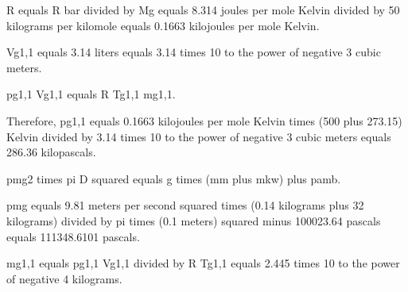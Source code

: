 R equals R bar divided by Mg equals 8.314 joules per mole Kelvin divided by 50 kilograms per kilomole equals 0.1663 kilojoules per mole Kelvin.

Vg1,1 equals 3.14 liters equals 3.14 times 10 to the power of negative 3 cubic meters.

pg1,1 Vg1,1 equals R Tg1,1 mg1,1.

Therefore, pg1,1 equals 0.1663 kilojoules per mole Kelvin times (500 plus 273.15) Kelvin divided by 3.14 times 10 to the power of negative 3 cubic meters equals 286.36 kilopascals.

pmg2 times pi D squared equals g times (mm plus mkw) plus pamb.

pmg equals 9.81 meters per second squared times (0.14 kilograms plus 32 kilograms) divided by pi times (0.1 meters) squared minus 100023.64 pascals equals 111348.6101 pascals.

mg1,1 equals pg1,1 Vg1,1 divided by R Tg1,1 equals 2.445 times 10 to the power of negative 4 kilograms.